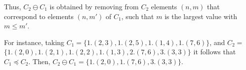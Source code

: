 \begin{definition}
\begin{itemize}
\begin{itemize}
        Thus, $C_2 \ominus C_1$ is obtained by removing from $C_2$ 
        elements $(n,m)$ that correspond to elements $(n,m')$ of $C_1$,
        such that $m$ is the largest value with $m\leq m'$.

        \vspace*{0.12cm}

        For instance, taking $C_1 = \{
             1.(2,3), 1.(2,5), 1.(1,4), 1.(7,6)
        \}$, and $C_2 = $ \linebreak
        $\{
             1.(2,0), 1.(2,1), 1.(2,2), 1.(1,3), 2.(7,6), 3.(3,3)
        \}$ it follows that $C_1 \preceq C_2$. Then,
        $C_2 \ominus C_1= \{
            1.(2,0), 1.(7,6), 3.(3,3)
        \}$.
  \end{itemize} 
\end{itemize}
\end{definition}

